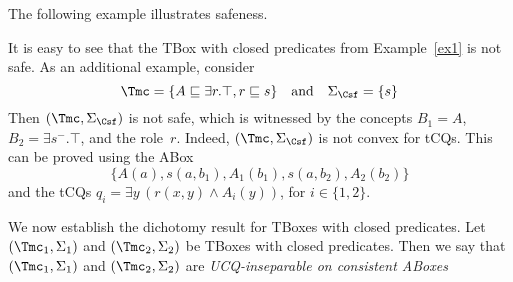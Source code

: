 \documentclass{lmcs}
\theoremstyle{definition}
\begin{document}
%
\smallskip
\noindent
The following example illustrates safeness.
\begin{exa}\label{ex:rolehierarchies}
It is easy to see that the TBox with closed predicates from Example~\ref{ex1} is not safe.
As an additional example, consider
$$
\Tmc = \{ A \sqsubseteq \exists r. \top, r \sqsubseteq s\} \quad \text{and} \quad \Sigma_\Csf = \{ s \}
$$
Then $(\Tmc,\Sigma_\Csf)$ is not safe, which is
  witnessed by the concepts $B_1 = A$, $B_2 =\exists s^- . \top$, and
  the role~$r$. Indeed, $(\Tmc,\Sigma_\Csf)$ is not convex for tCQs. This can be proved using the ABox  
$$
\{ A(a), s(a,b_1), A_1(b_1), s(a,b_2), A_2(b_2)\}
$$
and the tCQs   $q_i = \exists y\, (r(x,y) \wedge A_i(y))$, for $i \in \{1,2\}$.
\end{exa}
%
We now establish the dichotomy result for \dlliter TBoxes with closed predicates.
Let $(\Tmc_{1},\Sigma_{1})$ and $(\Tmc_{2},\Sigma_{2})$ be TBoxes with closed predicates.
Then we say that $(\Tmc_{1},\Sigma_{1})$ and $(\Tmc_{2},\Sigma_{2})$ are \emph{UCQ-inseparable on consistent ABoxes}~\cite{DBLP:conf/rweb/BotoevaKLRWZ16,DBLP:journals/ai/BotoevaKRWZ16}
\end{document}
